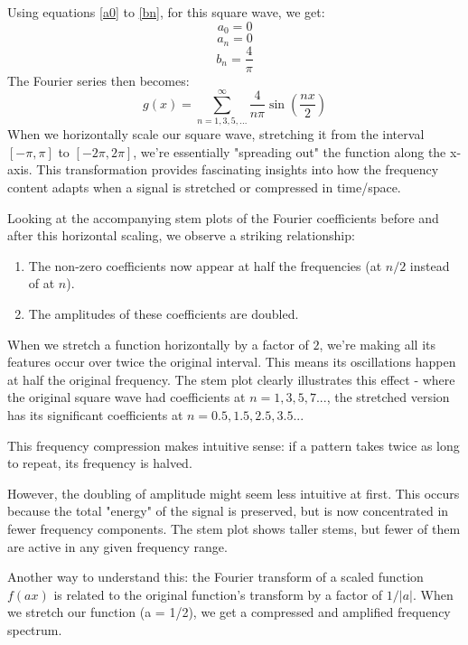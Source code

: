\documentclass{article}
\begin{document}
Using equations \ref{a0} to \ref{bn}, for this square wave, we get:
    \begin{equation}
    a_0 = 0
    \end{equation}
    \begin{equation}
    a_n = 0
    \end{equation}
    \begin{equation}
    b_n = \frac{4}{\pi}
    \end{equation}
The Fourier series then becomes:
\begin{equation}
g(x) = \sum_{n=1,3,5,...}^{\infty} \frac{4}{n\pi} \sin\left(\frac{nx}{2}\right)
\end{equation}
When we horizontally scale our square wave, stretching it from the interval $[-\pi, \pi]$ to $[-2\pi, 2\pi]$, we're essentially "spreading out" the function along the x-axis. This transformation provides fascinating insights into how the frequency content adapts when a signal is stretched or compressed in time/space.

Looking at the accompanying stem plots of the Fourier coefficients before and after this horizontal scaling, we observe a striking relationship:\\
\begin{enumerate}
\item The non-zero coefficients now appear at half the frequencies (at $n/2$ instead of at $n$).
\item The amplitudes of these coefficients are doubled.
\end{enumerate}
When we stretch a function horizontally by a factor of $2$, we're making all its features occur over twice the original interval. This means its oscillations happen at half the original frequency. The stem plot clearly illustrates this effect - where the original square wave had coefficients at $n = 1, 3, 5, 7...$, the stretched version has its significant coefficients at $n = 0.5, 1.5, 2.5, 3.5...$

This frequency compression makes intuitive sense: if a pattern takes twice as long to repeat, its frequency is halved.

However, the doubling of amplitude might seem less intuitive at first. This occurs because the total "energy" of the signal is preserved, but is now concentrated in fewer frequency components. The stem plot shows taller stems, but fewer of them are active in any given frequency range.

Another way to understand this: the Fourier transform of a scaled function $f(ax)$ is related to the original function's transform by a factor of $1/|a|$. When we stretch our function (a = 1/2), we get a compressed and amplified frequency spectrum.
\end{document}
